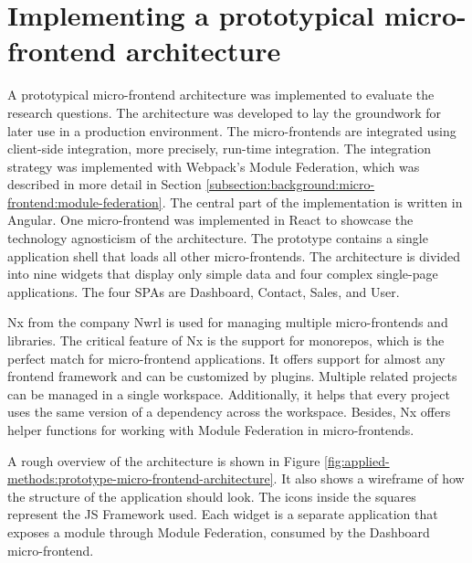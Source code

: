 \section{Implementing a prototypical micro-frontend architecture}\label{section:applied-methods:prototypical-implementation}

A prototypical micro-frontend architecture was implemented to evaluate the research questions. The architecture was developed to lay the groundwork for later use in a production environment. The micro-frontends are integrated using client-side integration, more precisely, run-time integration. The integration strategy was implemented with Webpack's Module Federation, which was described in more detail in Section \ref{subsection:background:micro-frontend:module-federation}. The central part of the implementation is written in Angular. One micro-frontend was implemented in React to showcase the technology agnosticism of the architecture. The prototype contains a single application shell that loads all other micro-frontends. The architecture is divided into nine widgets that display only simple data and four complex single-page applications. The four \acp{SPA} are Dashboard, Contact, Sales, and User.

\bigskip

\noindent Nx from the company Nwrl is used for managing multiple micro-frontends and libraries. The critical feature of Nx is the support for monorepos, which is the perfect match for micro-frontend applications. It offers support for almost any frontend framework and can be customized by plugins. Multiple related projects can be managed in a single workspace. Additionally, it helps that every project uses the same version of a dependency across the workspace. Besides, Nx offers helper functions for working with Module Federation in micro-frontends. \cite{misc:-:applied-methods:intro-to-nx}

\bigskip

\noindent A rough overview of the architecture is shown in Figure \ref{fig:applied-methods:prototype-micro-frontend-architecture}. It also shows a wireframe of how the structure of the application should look. The icons inside the squares represent the \ac{JS} Framework used. Each widget is a separate application that exposes a module through Module Federation, consumed by the Dashboard micro-frontend.

